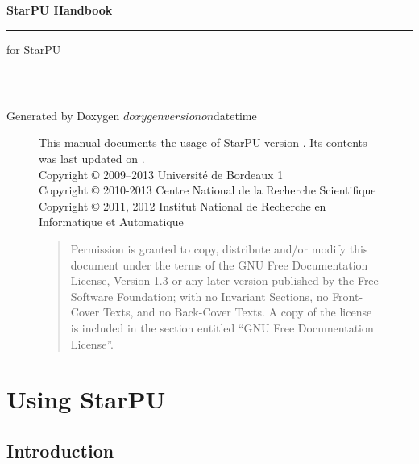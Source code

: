 \documentclass{book}
\begin{document}
\hypersetup{pageanchor=false,citecolor=blue}
\begin{titlepage}
\vspace*{4cm}
{\Huge \textbf{StarPU Handbook}}\\
\rule{\textwidth}{1.5mm}
\begin{flushright}
{\Large for StarPU \STARPUVERSION}
\end{flushright}
\rule{\textwidth}{1mm}
~\\
\vspace*{15cm}
\begin{flushright}
Generated by Doxygen $doxygenversion on $datetime
\end{flushright}
\end{titlepage}

\begin{figure}[p]
This manual documents the usage of StarPU version \STARPUVERSION. Its contents
was last updated on \STARPUUPDATED.\\

Copyright © 2009–2013 Université de Bordeaux 1\\

Copyright © 2010-2013 Centre National de la Recherche Scientifique\\

Copyright © 2011, 2012 Institut National de Recherche en Informatique et Automatique\\

\medskip

\begin{quote}
Permission is granted to copy, distribute and/or modify this document
under the terms of the GNU Free Documentation License, Version 1.3 or
any later version published by the Free Software Foundation; with no
Invariant Sections, no Front-Cover Texts, and no Back-Cover Texts. A
copy of the license is included in the section entitled “GNU Free
Documentation License”.
\end{quote}
\end{figure}

\clearemptydoublepage
{}
\tableofcontents
\clearemptydoublepage
{}
\hypersetup{pageanchor=true,citecolor=blue}

\part{Using StarPU}

\chapter{Introduction}
\label{index}
\hypertarget{index}{}

\end{document}
